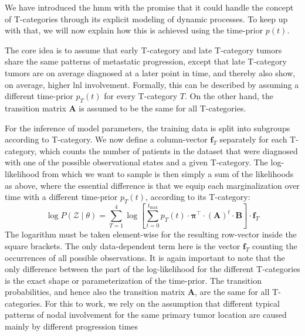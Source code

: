 \documentclass[\relativeRoot/main.tex]{subfiles}
\begin{document}
We have introduced the \gls{hmm} with the promise that it could handle the concept of T-categories through its explicit modeling of dynamic processes. To keep up with that, we will now explain how this is achieved using the time-prior $p(t)$.

The core idea is to assume that early T-category and late T-category tumors share the same patterns of metastatic progression, except that late T-category tumors are on average diagnosed at a later point in time, and thereby also show, on average, higher \gls{lnl} involvement. Formally, this can be described by assuming a different time-prior $p_T (t)$ for every T-category $T$.  On the other hand, the transition matrix $\mathbf{A}$ is assumed to be the same for all T-categories.

For the inference of model parameters, the training data is split into subgroups according to T-category. We now define a column-vector $\mathbf{f}_T$ separately for each T-category, which counts the number of patients in the dataset that were diagnosed with one of the possible observational states and a given T-category. The log-likelihood from which we want to sample is then simply a sum of the likelihoods as above, where the essential difference is that we equip each marginalization over time with a different time-prior $p_T (t)$, according to its T-category:
%
\begin{equation} \label{eq:hmm_log_likelihood}
    \log{P \left( \boldsymbol{\mathcal{Z}} \mid \theta \right)} = \sum_{T=1}^{4}{\log{\left[ \sum_{t = 0}^{t_\text{max}}{p_T (t) \cdot \boldsymbol{\pi}^\top \cdot (\mathbf{A})^t \cdot \mathbf{B}} \right]} \cdot \mathbf{f}_T}
\end{equation}
%
The logarithm must be taken element-wise for the resulting row-vector inside the square brackets. The only data-dependent term here is the vector $\mathbf{f}_T$ counting the occurrences of all possible observations. It is again important to note that the only difference between the part of the log-likelihood for the different T-categories is the exact shape or parameterization of the time-prior. The transition probabilities, and hence also the transition matrix $\mathbf{A}$, are the same for all T-categories. For this to work, we rely on the assumption that different typical patterns of nodal involvement for the same primary tumor location are caused mainly by different progression times
\end{document}
